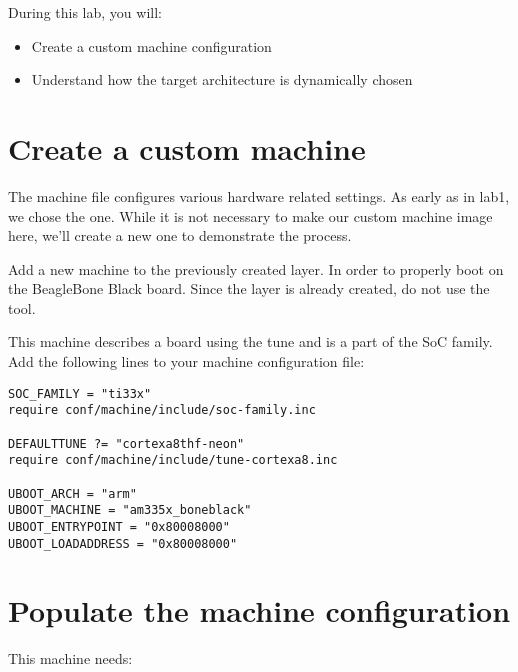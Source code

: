 
During this lab, you will:
\begin{itemize}
  \item Create a custom machine configuration
  \item Understand how the target architecture is dynamically chosen
\end{itemize}

\section{Create a custom machine}

The machine file configures various hardware related settings. As early as in
lab1, we chose the  one. While it is not necessary to
make our custom machine image here, we'll create a new one to demonstrate the
process.

Add a new  machine to the previously created layer. In order to
properly boot on the BeagleBone Black board. Since the
 layer is already created, do not use the
 tool.

This machine describes a board using the  tune
and is a part of the  SoC family. Add the following lines
to your machine configuration file:

\begin{verbatim}
SOC_FAMILY = "ti33x"
require conf/machine/include/soc-family.inc

DEFAULTTUNE ?= "cortexa8thf-neon"
require conf/machine/include/tune-cortexa8.inc

UBOOT_ARCH = "arm"
UBOOT_MACHINE = "am335x_boneblack"
UBOOT_ENTRYPOINT = "0x80008000"
UBOOT_LOADADDRESS = "0x80008000"
\end{verbatim}

\section{Populate the machine configuration}

This  machine needs:


